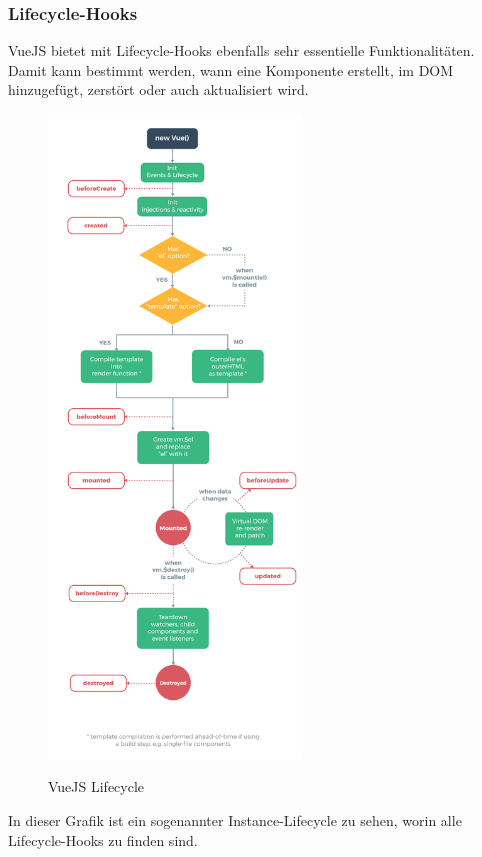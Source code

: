 \subsubsection{Lifecycle-Hooks}
VueJS bietet mit Lifecycle-Hooks ebenfalls sehr essentielle Funktionalitäten. Damit kann bestimmt werden, wann eine Komponente erstellt, im DOM hinzugefügt, zerstört oder auch aktualisiert wird. 
\newpage
\begin{figure}[h!]
    \centering
    \includegraphics[width=0.6\textwidth]{pics/vuejs-lifecycle.png}
    \caption{VueJS Lifecycle}
    \cite{frontend_web_vuejs_lifecycle}
    \label{fig:mesh1}
\end{figure}

In dieser Grafik ist ein sogenannter Instance-Lifecycle zu sehen, worin alle Lifecycle-Hooks zu finden sind.

